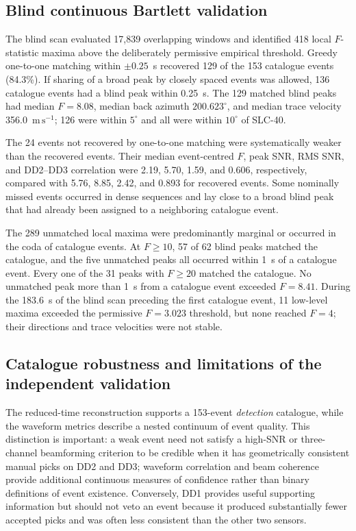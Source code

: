 \subsection{Blind continuous Bartlett validation}
\label{sec:results_continuous_bartlett}

The blind scan evaluated 17,839 overlapping windows and identified 418 local
\(F\)-statistic maxima above the deliberately permissive empirical threshold.
Greedy one-to-one matching within \(\pm0.25\)~s recovered 129 of the 153
catalogue events (84.3\%).  If sharing of a broad peak by closely spaced events
was allowed, 136 catalogue events had a blind peak within 0.25~s.  The 129
matched blind peaks had median \(F=8.08\), median back azimuth
\(200.623^{\circ}\), and median trace velocity
356.0~\(\mathrm{m\,s^{-1}}\); 126 were within \(5^{\circ}\) and all were within
\(10^{\circ}\) of SLC-40.

The 24 events not recovered by one-to-one matching were systematically weaker
than the recovered events.  Their median event-centred \(F\), peak SNR, RMS
SNR, and DD2--DD3 correlation were 2.19, 5.70, 1.59, and 0.606, respectively,
compared with 5.76, 8.85, 2.42, and 0.893 for recovered events.  Some nominally
missed events occurred in dense sequences and lay close to a broad blind peak
that had already been assigned to a neighboring catalogue event.

The 289 unmatched local maxima were predominantly marginal or occurred in the
coda of catalogue events.  At \(F\geq10\), 57 of 62 blind peaks matched the
catalogue, and the five unmatched peaks all occurred within 1~s of a catalogue
event.  Every one of the 31 peaks with \(F\geq20\) matched the catalogue.  No
unmatched peak more than 1~s from a catalogue event exceeded \(F=8.41\).
During the 183.6~s of the blind scan preceding the first catalogue event, 11
low-level maxima exceeded the permissive \(F=3.023\) threshold, but none
reached \(F=4\); their directions and trace velocities were not stable.

\subsection{Catalogue robustness and limitations of the independent validation}
\label{sec:discussion_catalogue_validation}

The reduced-time reconstruction supports a 153-event \emph{detection}
catalogue, while the waveform metrics describe a nested continuum of event
quality.  This distinction is important: a weak event need not satisfy a
high-SNR or three-channel beamforming criterion to be credible when it has
geometrically consistent manual picks on DD2 and DD3; waveform correlation and
beam coherence provide additional continuous measures of confidence rather
than binary definitions of event existence.  Conversely, DD1 provides useful
supporting information but should not
veto an event because it produced substantially fewer accepted picks and was
often less consistent than the other two sensors.

